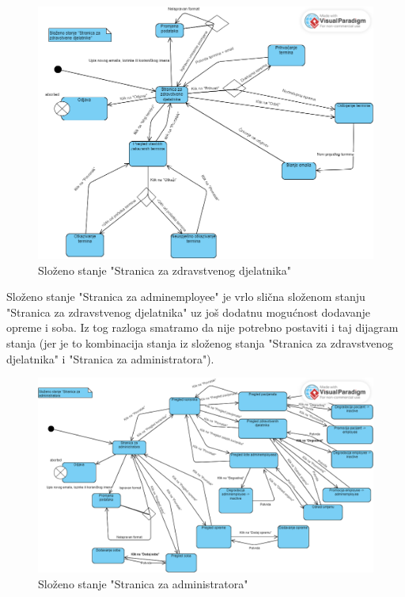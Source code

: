 		\begin{figure}[H]
			\includegraphics[scale=0.5]{slike/DijagramStanja3.PNG} %
			\centering
			\caption{Složeno stanje "Stranica za zdravstvenog djelatnika"}
			\label{fig:promjene}
		\end{figure}
		
		Složeno stanje "Stranica za adminemployee" je vrlo slična složenom stanju "Stranica za zdravstvenog djelatnika" uz još dodatnu mogućnost dodavanje opreme i soba. Iz tog razloga smatramo da nije potrebno postaviti i taj dijagram stanja (jer je to kombinacija stanja iz složenog stanja "Stranica za zdravstvenog djelatnika" i "Stranica za administratora").
			
				\begin{figure}[H]
				\includegraphics[scale=0.4]{slike/DijagramStanja4.PNG} %
				\centering
				\caption{Složeno stanje "Stranica za administratora"}
				\label{fig:promjene}
			\end{figure}
			
